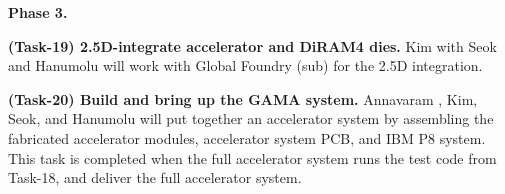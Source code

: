 \noindent
\textbf{Phase 3.}

\noindent
\textbf{(Task-19) 2.5D-integrate accelerator and DiRAM4 dies.}
Kim with Seok and Hanumolu will work with Global Foundry (sub) for the 2.5D integration.


\vspace{3pt}
\noindent
\textbf{(Task-20) Build and bring up the GAMA system.}
Annavaram , Kim, Seok, and Hanumolu will put together an accelerator system by assembling
the fabricated accelerator modules, accelerator system PCB, and IBM P8 system.
This task is completed when the full accelerator system runs the test code from Task-18, and deliver the full accelerator system.


\begin{comment}
Task 3.X: Our accelerator chip fabrication and chip-level testing \underline{Seok (Columbia), Kim (UIUC), Hanumolu (UIUC), Annavaram (USC), Hwu (UIUC)}
Completion criteria: fabricated chips, verified in the chip level
Approach: We will perform intensive pre-silicon verifications for functional, thermal, voltage integrity, noise, and testability aspects. We will tape-out the accelerator chip in a 28nm CMOS technology. We will test the accelerator chip without DiRAMs. 
Task 3.2: 2.5D integration of our accelerator chip and memory stacks, packaging, and testing \underline{?}
Completion criteria and deliverables: Functioning 2.5D integrated hardware of the accelerators and DiRAMs. 
Approach:  We will integrate the accelerator chip with two DiRAMs using a silicon interposer. 
The silicon interposer that creates 2,000 connection to the accelerator chip per DiRAM will be fabricated by a company (XXXXX). 
The interposer will be either connected to a custom PCB directly or enclosed on a BGA type package. 
If necessary, we will mount a off-the-shelf cooler, potentially modified to fit, on top of the accelerator chip. 
\end{comment}

